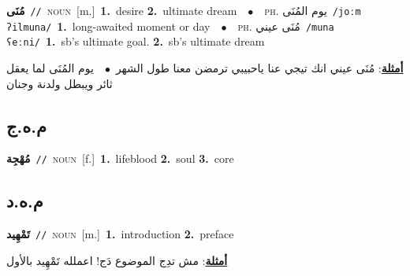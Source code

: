 \documentclass[10pt,a4paper,twoside]{article} %
\begin{document}
\begin{multicols}{2}
{\setlength\topsep{0pt}\textbf{\foreignlanguage{arabic}{مُنَى}}\ {\color{gray}\texttt{//}\color{black}}\ \textsc{noun}\ [m.]\ \textbf{1.}~desire  \textbf{2.}~ultimate dream\ \ $\bullet$\ \ \textsc{ph.} \color{gray} \foreignlanguage{arabic}{يوم المُنَى}\color{black}\ {\color{gray}\texttt{/{\sffamily joːm ʔilmuna}/}\color{black}}\ \textbf{1.}~long-awaited moment or day\ \ $\bullet$\ \ \textsc{ph.} \color{gray} \foreignlanguage{arabic}{مُنَى عيني}\color{black}\ {\color{gray}\texttt{/{\sffamily muna ʕeːni}/}\color{black}}\ \textbf{1.}~sb's ultimate goal.  \textbf{2.}~sb's ultimate dream\  \begin{flushright}\color{gray}\foreignlanguage{arabic}{\textbf{\underline{\foreignlanguage{arabic}{أمثلة}}}: مُنَى عيني انك تيجي عنا ياحبيبي ترمضن معنا طول الشهر\ $\bullet$\ \  يوم المُنَى لما يعقل ثائر ويبطل ولدنة وجنان}\end{flushright}\color{black}} \vspace{2mm}

\vspace{-3mm}
\subsection*{\color{blue}\foreignlanguage{arabic}{م.ه.ج}\color{blue}{}} 

{\setlength\topsep{0pt}\textbf{\foreignlanguage{arabic}{مُهْجِة}}\ {\color{gray}\texttt{//}\color{black}}\ \textsc{noun}\ [f.]\ \textbf{1.}~lifeblood  \textbf{2.}~soul  \textbf{3.}~core\ } \vspace{2mm}

\vspace{-3mm}
\subsection*{\color{blue}\foreignlanguage{arabic}{م.ه.د}\color{blue}{}} 

{\setlength\topsep{0pt}\textbf{\foreignlanguage{arabic}{تَمْهِيد}}\ {\color{gray}\texttt{//}\color{black}}\ \textsc{noun}\ [m.]\ \textbf{1.}~introduction  \textbf{2.}~preface\  \begin{flushright}\color{gray}\foreignlanguage{arabic}{\textbf{\underline{\foreignlanguage{arabic}{أمثلة}}}: مش تدِج الموضوع دَج! اعملله تَمْهِيد بالأول}\end{flushright}\color{black}} \vspace{2mm}


\end{multicols}
\end{document}
